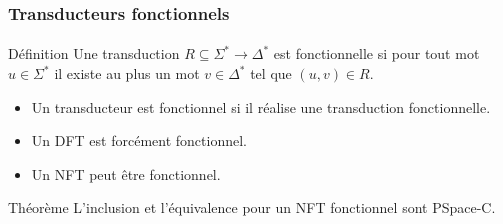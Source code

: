 \frametitle{Transducteurs fonctionnels}
\framesubtitle{}

\begin{block}{Définition}
	Une transduction $R \subseteq \Sigma^* \to \Delta^*$ est fonctionnelle si pour tout mot $u \in \Sigma^*$ il existe au plus un mot $v \in \Delta^*$ tel que $(u,v) \in R.$
\end{block}

\begin{itemize}
	\item Un transducteur est fonctionnel si il réalise une transduction fonctionnelle.
	\item Un DFT est forcément fonctionnel.
	\item Un NFT peut être fonctionnel.
\end{itemize}

\pause
\begin{block}{Théorème}
	L'inclusion et l'équivalence pour un NFT fonctionnel sont PSpace-C.
\end{block}